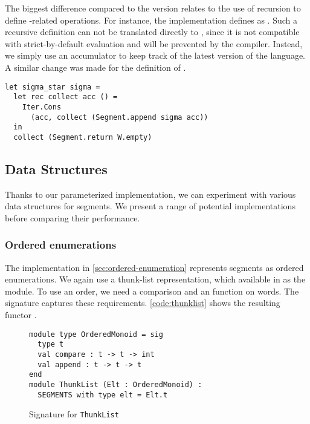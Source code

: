 The biggest difference compared to the \haskell version relates to the use
of recursion to define -related operations.
For instance, the \haskell implementation defines  as
. Such a recursive definition
can not be translated directly to \ocaml, since it is not compatible with
strict-by-default evaluation and will be prevented by the compiler.
Instead, we simply use an accumulator to keep track of the latest version
of the language.
A similar change was made for the definition of .
\begin{lstlisting}
let sigma_star sigma =
  let rec collect acc () =
    Iter.Cons 
      (acc, collect (Segment.append sigma acc))
  in
  collect (Segment.return W.empty)
\end{lstlisting}


\subsection{Data Structures}

Thanks to our parameterized implementation, we can
experiment with various data structures for segments. We present a
range of potential implementations before comparing their performance.

\subsubsection{Ordered enumerations}

The \haskell implementation in \autoref{sec:ordered-enumeration}
represents segments as ordered enumerations.
We again use a thunk-list representation,
which available in \ocaml as the  module.
To use an order, we need a comparison and an
 function on words.  The  signature
captures these requirements. \autoref{code:thunklist} shows the
resulting functor .

\begin{figure}[hbt]
  \centering
\begin{lstlisting}
module type OrderedMonoid = sig
  type t
  val compare : t -> t -> int
  val append : t -> t -> t
end
module ThunkList (Elt : OrderedMonoid) :
  SEGMENTS with type elt = Elt.t
\end{lstlisting}
  \caption{Signature for \texttt{ThunkList}}
  \label{code:thunklist}
\end{figure}



